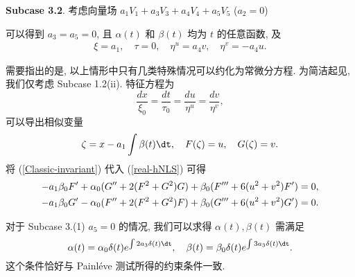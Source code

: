 \textbf{Subcase 3.2}. 考虑向量场 $a_1 V_1+a_3 V_3+a_4 V_4+a_5 V_5$ ($a_2= 0$)

可以得到 $a_3=a_5=0$, 且 $\alpha(t)$ 和 $\beta(t)$ 均为 $t$ 的任意函数, 及
\begin{align*}
\xi=a_1,\quad \tau=0,\quad \eta^u=a_4v,\quad \eta^v=-a_4u.
\end{align*}

需要指出的是, 以上情形中只有几类特殊情况可以约化为常微分方程. 为简洁起见, 我们仅考虑
Subcase 1.2(ii).
特征方程为
\begin{equation*}
\frac{dx}{\xi_0}=\frac{dt}{\tau_0}=\frac{du}{\eta^u}=\frac{dv}{\eta^v},
\end{equation*}
可以导出相似变量
\begin{align}\label{Classic-invariant}
\zeta=x-a_1\int\beta(t)\dt,\quad F(\zeta)=u,\quad G(\zeta)=v .
\end{align}
将 (\ref{Classic-invariant}) 代入 (\ref{real-hNLS}) 可得
\begin{align}
-a_1\beta_0F'+\alpha_0(G''+2(F^2+G^2)G)+\beta_0(F'''+6(u^2+v^2)F')=0,\notag\\
-a_1\beta_0G'-\alpha_0(F''+2(F^2+G^2)F)+\beta_0(G'''+6(u^2+v^2)G')=0.
\end{align}

对于 Subcase 3.(1) $a_5=0$ 的情况, 我们可以求得 $\alpha(t), \beta(t)$ 需满足
\begin{equation}
\alpha(t)=\alpha_0\delta(t)e^{\int2a_3\delta(t)\dt},\quad \beta(t)=\beta_0\delta(t)e^{\int3a_3\delta(t)\dt}.
\end{equation}
这个条件恰好与 Painl\'{e}ve 测试所得的约束条件一致.



